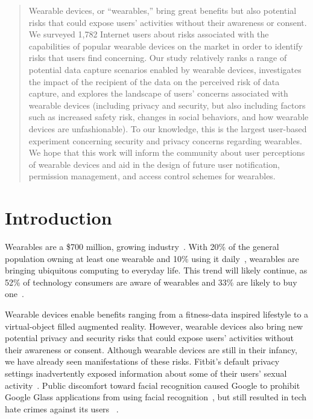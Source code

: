 \documentclass[conference]{IEEEtran}
\begin{document}
\begin{abstract}
\noindent Wearable devices, or ``wearables,'' bring great benefits but also potential risks that could expose users' activities without their awareness or consent. We surveyed 1,782 Internet users about risks associated with the capabilities of popular wearable devices on the market in order to identify risks that users find concerning. Our study relatively ranks a range of potential data capture scenarios enabled by wearable devices, investigates the impact of the recipient of the data on the perceived risk of data capture, and explores the landscape of users' concerns associated with wearable devices (including privacy and security, but also including factors such as increased safety risk, changes in social behaviors, and how wearable devices are unfashionable). To our knowledge, this is the largest user-based experiment concerning security and privacy concerns regarding wearables. We hope that this work will inform the community about user perceptions of wearable devices and aid in the design of future user notification, permission management, and access control schemes for wearables.
\end{abstract}

\section{Introduction}

Wearables are a \$700 million, growing industry~\cite{cmo}. With 20\% of the general population owning at least one wearable and 10\% using it daily~\cite{WearableStatNews}, wearables are bringing ubiquitous computing to everyday life. This trend will likely continue, as 52\% of technology consumers are aware of wearables and 33\% are likely to buy one~\cite{NPD}.  

Wearable devices enable benefits ranging from a fitness-data inspired lifestyle to a virtual-object filled augmented reality. However, wearable devices also bring new potential privacy and security risks that could expose users' activities without their awareness or consent. Although wearable devices are still in their infancy, we have already seen manifestations of these risks. Fitbit's default privacy settings inadvertently exposed information about some of their users' sexual activity~\cite{Fitbit}. Public discomfort toward facial recognition caused Google to prohibit Google Glass applications from using facial recognition~\cite{GlassDetection}, but still resulted in tech hate crimes against its users ~\cite{1_russell_2014, 16_gross_2014}. 
\end{document}
